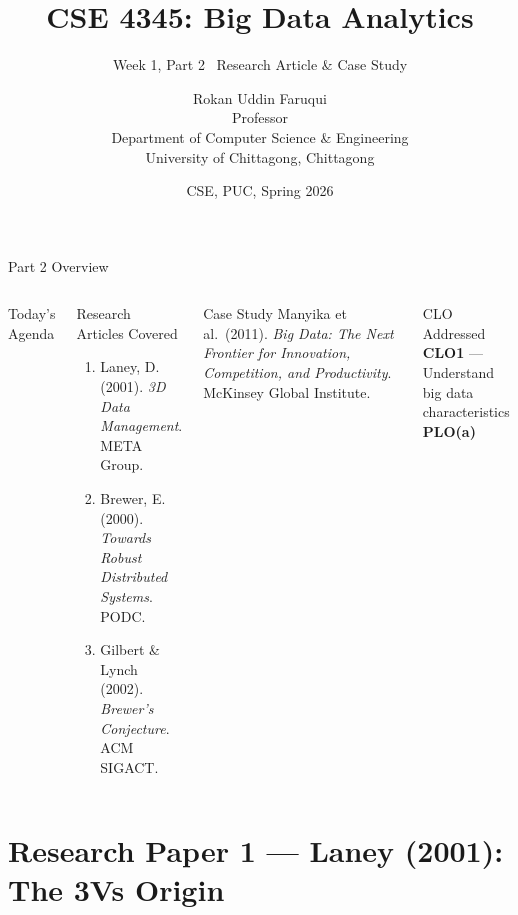 \documentclass[aspectratio=169,10pt]{beamer}
\title[CSE 4345 \textbar{} Week 1, Part 2]{CSE 4345: Big Data Analytics}
\subtitle{Week 1, Part 2 \textemdash\ Research Article \& Case Study}
\author[Dept.\ of CSE]{{\sc Rokan Uddin Faruqui} \\ Professor \\ Department of Computer Science \& Engineering\\[4pt]
       \small University of Chittagong, Chittagong}
\institute{}
\date{CSE, PUC, Spring 2026}
\begin{document}

\begin{frame}
  \titlepage
\end{frame}

\begin{frame}{Part 2 Overview}
  \begin{columns}[T]
      \begin{block}{Today's Agenda}
        \tableofcontents
      \end{block}

      \begin{exampleblock}{Research Articles Covered}
        \begin{enumerate}
          \item Laney, D. (2001). \textit{3D Data Management}. META Group.
          \item Brewer, E. (2000). \textit{Towards Robust Distributed Systems}. PODC.
          \item Gilbert \& Lynch (2002). \textit{Brewer's Conjecture}. ACM SIGACT.
        \end{enumerate}
      \end{exampleblock}
      \vspace{6pt}
      \begin{alertblock}{Case Study}
        Manyika et al.\ (2011). \textit{Big Data: The Next Frontier for Innovation, Competition, and Productivity}. McKinsey Global Institute.
      \end{alertblock}
      \vspace{4pt}
      \begin{block}{CLO Addressed}
        \textbf{CLO1} — Understand big data characteristics\\
        \textbf{PLO(a)}
      \end{block}
  \end{columns}
\end{frame}

\section{Research Paper 1 — Laney (2001): The 3Vs Origin}
\end{document}
